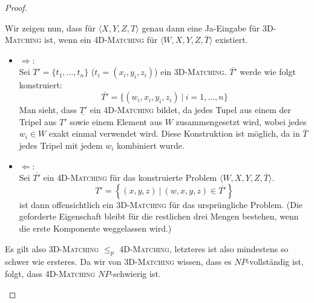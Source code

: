\documentclass[a4paper]{scrartcl}
\begin{document}
\begin{enumerate}[label=\bfseries \arabic*.]
\begin{enumerate}
\begin{proof}
\begin{enumerate}
                Wir zeigen nun, dass für $\langle X,Y,Z,T \rangle$ genau dann
                eine Ja-Eingabe für \textsc{3D-Matching} ist, wenn ein
                \textsc{4D-Matching} für $\langle W,X,Y,Z,\overline{T} \rangle$
                existiert.
                \begin{itemize}
                    \item $\Rightarrow$: \\
                        Sei $T' = \{t_1, \dotsc, t_n\}$ ($t_i = (x_i, y_i,
                        z_i)$) ein \textsc{3D-Matching}.  $\overline{T'}$ werde
                        wie folgt konstruiert:
                        \begin{equation*}
                            \overline{T'} = \{ (w_i, x_i, y_i, z_i)\ |\ i = 1, \dotsc, n \}
                        \end{equation*}
                        Man sieht, dass $\underline{T'}$ ein
                        \textsc{4D-Matching} bildet, da jedes Tupel aus einem
                        der Tripel aus $T'$ sowie einem Element aus $W$
                        zusammengesetzt wird, wobei jedes $w_i \in W$ exakt
                        einmal verwendet wird.  Diese Konstruktion ist möglich,
                        da in $\overline{T}$ jedes Tripel mit jedem $w_i$
                        kombiniert wurde.

                    \item $\Leftarrow$: \\
                        Sei $\overline{T'}$ ein \textsc{4D-Matching} für das
                        konstruierte Problem $\langle W,X,Y,Z,\overline{T}
                        \rangle$.
                        \begin{equation*}
                            T' = \left\{ (x,y,z)\ |\ (w,x,y,z) \in \overline{T'} \right\}
                        \end{equation*}
                        ist dann offensichtlich ein \textsc{3D-Matching} für
                        das ursprüngliche Problem. (Die geforderte Eigenschaft
                        bleibt für die restlichen drei Mengen bestehen, wenn
                        die erste Komponente weggelassen wird.)
                \end{itemize}

                Es gilt also \textsc{3D-Matching} $\leq_p$
                \textsc{4D-Matching}, letzteres ist also mindestens so schwer
                wie ersteres. Da wir von \textsc{3D-Matching} wissen, dass es
                $NP$-vollständig ist, folgt, dass \textsc{4D-Matching}
                $NP$-schwierig ist.


\end{enumerate}
\end{proof}
\end{enumerate}
\end{enumerate}
\end{document}
